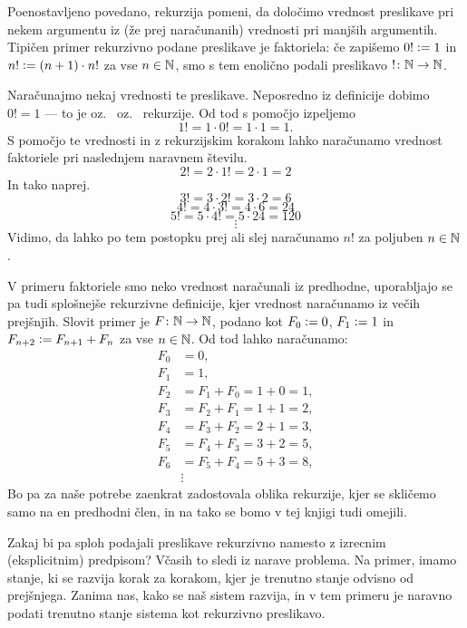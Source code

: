 Poenostavljeno povedano, rekurzija pomeni, da določimo vrednost preslikave pri nekem argumentu iz (že prej naračunanih) vrednosti pri manjših argumentih. Tipičen primer rekurzivno podane preslikave je faktoriela: če zapišemo $0! \mathrel{\mathop:}= 1$ in $n! \mathrel{\mathop:}= (n+1) \cdot n!$ za vse $n \in \mathbb{N}$, smo s tem enolično podali preslikavo $!\colon \mathbb{N} \to \mathbb{N}$.

Naračunajmo nekaj vrednosti te preslikave. Neposredno iz definicije dobimo $0! = 1$ --- to je  oz.~ oz.~ rekurzije. Od tod s pomočjo  izpeljemo
\[1! = 1 \cdot 0! = 1 \cdot 1 = 1.\]
S pomočjo te vrednosti in z rekurzijskim korakom lahko naračunamo vrednost faktoriele pri naslednjem naravnem številu.
\[2! = 2 \cdot 1! = 2 \cdot 1 = 2\]
In tako naprej.
\[3! = 3 \cdot 2! = 3 \cdot 2 = 6\]
\[4! = 4 \cdot 3! = 4 \cdot 6 = 24\]
\[5! = 5 \cdot 4! = 5 \cdot 24 = 120\]
\[\vdots\]
Vidimo, da lahko po tem postopku prej ali slej naračunamo $n!$ za poljuben $n \in \mathbb{N}$.

V primeru faktoriele smo neko vrednost naračunali iz predhodne, uporabljajo se pa tudi splošnejše rekurzivne definicije, kjer vrednost naračunamo iz večih prejšnjih. Slovit primer je  $F\colon \mathbb{N} \to \mathbb{N}$, podano kot $F_0 \mathrel{\mathop:}= 0$, $F_1 \mathrel{\mathop:}= 1$ in $F_{n+2} \mathrel{\mathop:}= F_{n+1} + F_n$ za vse $n \in \mathbb{N}$. Od tod lahko naračunamo:
\begin{align*}
F_0 &= 0, \\
F_1 &= 1, \\
F_2 &= F_1 + F_0 = 1 + 0 = 1, \\
F_3 &= F_2 + F_1 = 1 + 1 = 2, \\
F_4 &= F_3 + F_2 = 2 + 1 = 3, \\
F_5 &= F_4 + F_3 = 3 + 2 = 5, \\
F_6 &= F_5 + F_4 = 5 + 3 = 8, \\
&\vdots
\end{align*}
Bo pa za naše potrebe zaenkrat zadostovala oblika rekurzije, kjer se skličemo samo na en predhodni člen, in na tako se bomo v tej knjigi tudi omejili. 

Zakaj bi pa sploh podajali preslikave rekurzivno namesto z izrecnim (eksplicitnim) predpisom? Včasih to sledi iz narave problema. Na primer, imamo stanje, ki se razvija korak za korakom, kjer je trenutno stanje odvisno od prejšnjega. Zanima nas, kako se naš sistem razvija, in v tem primeru je naravno podati trenutno stanje sistema kot rekurzivno preslikavo. 

